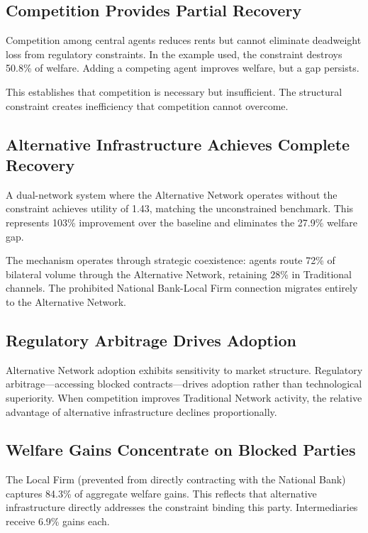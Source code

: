 \subsection{Competition Provides Partial Recovery}

Competition among central agents reduces rents but cannot eliminate deadweight loss from regulatory constraints. In the example used, the constraint destroys 50.8\% of welfare. Adding a competing agent improves welfare, but a gap persists.

This establishes that competition is necessary but insufficient. The structural constraint creates inefficiency that competition cannot overcome.

\subsection{Alternative Infrastructure Achieves Complete Recovery}

A dual-network system where the Alternative Network operates without the constraint achieves utility of 1.43, matching the unconstrained benchmark. This represents 103\% improvement over the baseline and eliminates the 27.9\% welfare gap.

The mechanism operates through strategic coexistence: agents route 72\% of bilateral volume through the Alternative Network, retaining 28\% in Traditional channels. The prohibited National Bank-Local Firm connection migrates entirely to the Alternative Network.

\subsection{Regulatory Arbitrage Drives Adoption}

Alternative Network adoption exhibits sensitivity to market structure. Regulatory arbitrage—accessing blocked contracts—drives adoption rather than technological superiority. When competition improves Traditional Network activity, the relative advantage of alternative infrastructure declines proportionally.

\subsection{Welfare Gains Concentrate on Blocked Parties}

The Local Firm (prevented from directly contracting with the National Bank) captures 84.3\% of aggregate welfare gains. This reflects that alternative infrastructure directly addresses the constraint binding this party. Intermediaries receive 6.9\% gains each.

